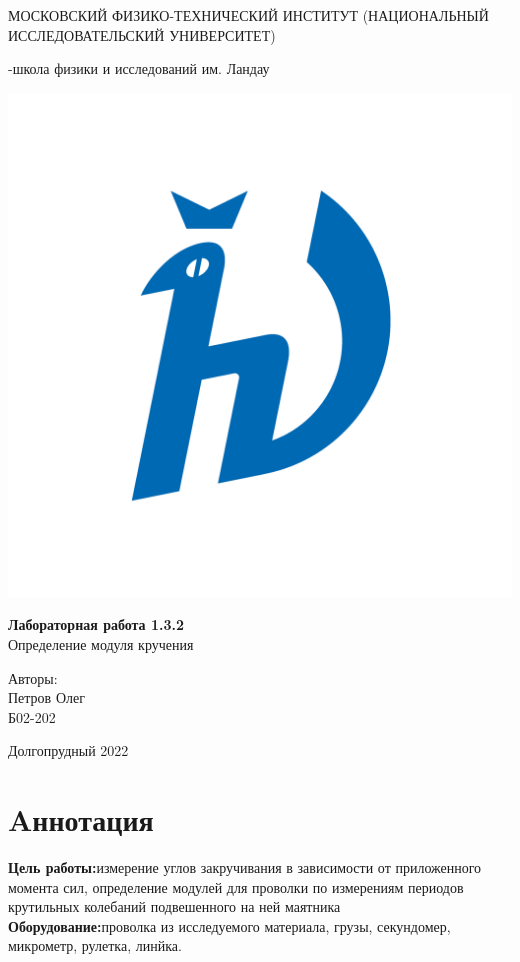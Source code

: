 \documentclass[a4paper,12pt]{article} %
\begin{document}
\begin{titlepage}
\begin{center}
    {\large МОСКОВСКИЙ ФИЗИКО-ТЕХНИЧЕСКИЙ ИНСТИТУТ (НАЦИОНАЛЬНЫЙ ИССЛЕДОВАТЕЛЬСКИЙ УНИВЕРСИТЕТ)}
\end{center}
\begin{center}
    {-школа физики и исследований им. Ландау}
\end{center}

\vspace{3.5cm}

\begin{center}
    \includegraphics[width=0.4\linewidth]{hv_full.png}
\end{center}
\vspace{0.1cm}
{\huge
\begin{center}
    {\bf Лабораторная работа 1.3.2}\\
    Определение модуля кручения
\end{center}
}
\vspace{2cm}
\begin{flushright}
{\LARGE Авторы:\\ Петров Олег \\
\vspace{0.2cm}
Б02-202}
\end{flushright}
\vspace{3.5cm}
\begin{center}
    Долгопрудный 2022
\end{center}
\end{titlepage}

\section{Aннотация}
\textbf{Цель работы:}измерение углов закручивания в зависимости от приложенного момента
сил, определение модулей для проволки по измерениям периодов крутильных колебаний подвешенного на
ней маятника\\
\textbf{Оборудование:}проволка из исследуемого материала,
грузы, секундомер, микрометр, рулетка, линйка.
\end{document}
